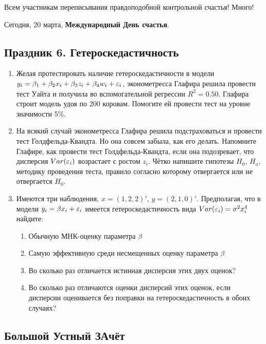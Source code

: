 \documentclass[12pt, a4paper]{article}
\begin{document}
\vspace{20pt}

Всем участникам переписывания правдоподобной контрольной счастья! Много!

\vspace{20pt}

Сегодня, 20 марта, \textbf{Международный День счастья}.


\subsection{Праздник 6. Гетероскедастичность}

\begin{enumerate}
\item Желая протестировать наличие гетероскедастичности в модели $y_i=\beta_1+\beta_2 x_i +\beta_3 z_i +\beta_4 w_i +\varepsilon_i$, эконометресса Глафира решила провести тест Уайта и получила  во вспомогательной регрессии $R^2=0.50$. Глафира строит модель удоя по 200 коровам. Помогите ей провести тест на уровне значимости 5\%.
\item На всякий случай эконометресса Глафира решила подстраховаться и провести тест Голдфельда-Квандта. Но она совсем забыла, как его делать. Напомните Глафире, как провести тест Голдфельда-Квандта, если она подозревает, что дисперсия $Var(\varepsilon_i)$ возрастает с ростом $z_i$. Чётко напишите гипотезы $H_0$, $H_a$, методику проведения теста, правило согласно которому отвергается или не отвергается $H_0$.
\item Имеются три наблюдения, $x=(1,2,2)'$, $y=(2,1,0)'$. Предполагая, что в модели $y_i=\beta x_i + \varepsilon_i$ имеется гетероскедастичность вида $Var(\varepsilon_i)=\sigma^2 x_i^4$ найдите:
\begin{enumerate}
\item Обычную МНК-оценку параметра $\beta$
\item Самую эффективную среди несмещенных оценку параметра $\beta$
\item Во сколько раз отличается истинная дисперсия этих двух оценок?
\item Во сколько раз отличаются оценки дисперсий этих оценок, если дисперсии оценивается без поправки на гетероскедастичность в обоих случаях?
\end{enumerate}
\end{enumerate}

\subsection{Большой Устный ЗАчёт}
\end{document}
